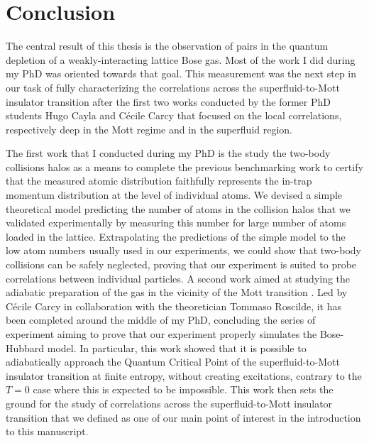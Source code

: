 \chapterimage{}

\chapter*{Conclusion}

\label{chap:conclusion}



The central result of this thesis is the observation of \kmk pairs in the quantum depletion of a weakly-interacting lattice Bose gas. Most of the work I did during my PhD was oriented towards that goal. This measurement was the next step in our task of fully characterizing the correlations across the superfluid-to-Mott insulator transition after the first two works \cite{carcy2019momentum,cayla2020} conducted by the former PhD students Hugo Cayla and Cécile Carcy that focused on the local correlations, respectively deep in the Mott regime and in the superfluid region. 

The first work that I conducted during my PhD is the study the two-body collisions halos \cite{tenart2020two} as a means to complete the previous benchmarking work \cite{cayla2018single} to certify that the measured atomic distribution faithfully represents the in-trap momentum distribution at the level of individual atoms. We devised a simple theoretical model predicting the number of atoms in the collision halos that we validated experimentally by measuring this number for large number of atoms loaded in the lattice. Extrapolating the predictions of the simple model to the low atom numbers usually used in our experiments, we could show that two-body collisions can be safely neglected, proving that our experiment is suited to probe correlations between individual particles. A second work aimed at studying the adiabatic preparation of the gas in the vicinity of the Mott transition \cite{carcy2021}. Led by Cécile Carcy in collaboration with the theoretician Tommaso Roscilde, it has been completed around the middle of my PhD, concluding the series of experiment aiming to prove that our experiment properly simulates the Bose-Hubbard model. In particular, this work showed that it is possible to adiabatically approach the Quantum Critical Point of the superfluid-to-Mott insulator transition at finite entropy, \ie without creating excitations, contrary to the $T=0$ case where this is expected to be impossible. This work then sets the ground for the study of correlations across the superfluid-to-Mott insulator transition that we defined as one of our main point of interest in the introduction to this manuscript.

